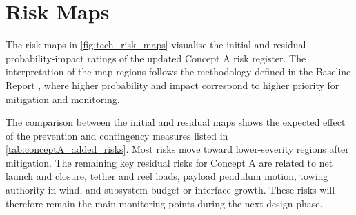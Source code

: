 \section{Risk Maps}





The risk maps in \autoref{fig:tech_risk_maps} visualise the initial and residual probability-impact ratings of the updated Concept A risk register. The interpretation of the map regions follows the methodology defined in the Baseline Report \cite{bellona2026baseline}, where higher probability and impact correspond to higher priority for mitigation and monitoring.

The comparison between the initial and residual maps shows the expected effect of the prevention and contingency measures listed in \autoref{tab:conceptA_added_risks}. Most risks move toward lower-severity regions after mitigation. The remaining key residual risks for Concept A are related to net launch and closure, tether and reel loads, payload pendulum motion, towing authority in wind, and subsystem budget or interface growth. These risks will therefore remain the main monitoring points during the next design phase.
